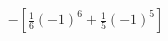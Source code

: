 \documentclass[preview]{standalone}
\begin{document}
\begin{align*}
-[\frac{1}{6} (-1)^6 + \frac{1}{5} (-1)^5]
\end{align*}
\end{document}
